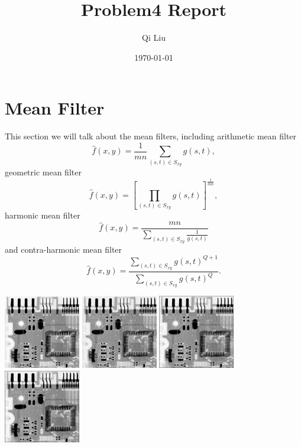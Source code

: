 \documentclass{article}
\title{Problem4 Report}
\author{Qi Liu}
\date{\today}
\begin{document}
\maketitle

\section{Mean Filter}
This section we will talk about the mean filters, including arithmetic mean filter $$\hat{f}(x,y)=\frac{1}{mn}\sum_{(s,t)\in S_{xy}}g(s,t),$$ geometric mean filter $$\hat{f}(x,y)=[\prod_{(s,t)\in S_{xy}}g(s,t)]^{\frac{1}{mn}},$$ harmonic mean filter $$\hat{f}(x,y)=\frac{mn}{\sum\limits_{(s,t)\in S_{xy}}\frac{1}{g(s,t)}}$$ and contra-harmonic mean filter $$\hat{f}(x,y)=\frac{\sum\limits_{(s,t)\in S_{xy}}g(s,t)^{Q+1}}{\sum\limits_{(s,t)\in S_{xy}}g(s,t)^Q}.$$

\includegraphics[width=0.25\textwidth]{../data/Circuit.jpg}
\includegraphics[width=0.25\textwidth]{../data/gauss_Circuit.jpg}
\includegraphics[width=0.25\textwidth]{../data/arithmetic_mean_gauss_Circuit.jpg}
\includegraphics[width=0.25\textwidth]{../data/geometric_mean_gauss_Circuit.jpg}
\end{document}
